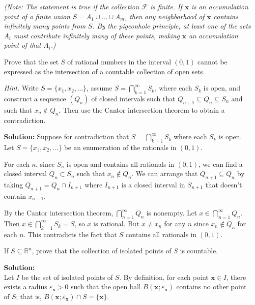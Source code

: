 \textit{(Note: The statement is true if the collection $\mathcal{F}$ is finite. If $\mathbf{x}$ is an accumulation point of a finite union $S = A_1 \cup \dots \cup A_m$, then any neighborhood of $\mathbf{x}$ contains infinitely many points from $S$. By the pigeonhole principle, at least one of the sets $A_i$ must contribute infinitely many of these points, making $\mathbf{x}$ an accumulation point of that $A_i$.)}


\begin{problembox}
Prove that the set \( S \) of rational numbers in the interval \( (0, 1) \) cannot be expressed as the intersection of a countable collection of open sets. 

\textit{Hint.} Write \( S = \{x_1, x_2, \ldots\} \), assume \( S = \bigcap_{k=1}^{\infty} S_k \), where each \( S_k \) is open, and construct a sequence \( (Q_n) \) of closed intervals such that \( Q_{n+1} \subseteq Q_n \subseteq S_n \) and such that \( x_n \notin Q_n \). Then use the Cantor intersection theorem to obtain a contradiction.
\end{problembox}

\textbf{Solution:} Suppose for contradiction that $S = \bigcap_{k=1}^{\infty} S_k$ where each $S_k$ is open. Let $S = \{x_1, x_2, \ldots\}$ be an enumeration of the rationals in $(0,1)$.

For each $n$, since $S_n$ is open and contains all rationals in $(0,1)$, we can find a closed interval $Q_n \subset S_n$ such that $x_n \notin Q_n$. We can arrange that $Q_{n+1} \subseteq Q_n$ by taking $Q_{n+1} = Q_n \cap I_{n+1}$ where $I_{n+1}$ is a closed interval in $S_{n+1}$ that doesn't contain $x_{n+1}$.

By the Cantor intersection theorem, $\bigcap_{n=1}^{\infty} Q_n$ is nonempty. Let $x \in \bigcap_{n=1}^{\infty} Q_n$. Then $x \in \bigcap_{k=1}^{\infty} S_k = S$, so $x$ is rational. But $x \neq x_n$ for any $n$ since $x_n \notin Q_n$ for each $n$. This contradicts the fact that $S$ contains all rationals in $(0,1)$.

\begin{problembox}
If \( S \subseteq \mathbb{R}^n \), prove that the collection of isolated points of \( S \) is countable.
\end{problembox}

\textbf{Solution:}\\
Let $I$ be the set of isolated points of $S$. By definition, for each point $\mathbf{x} \in I$, there exists a radius $\varepsilon_{\mathbf{x}} > 0$ such that the open ball $B(\mathbf{x}; \varepsilon_{\mathbf{x}})$ contains no other point of $S$; that is, $B(\mathbf{x}; \varepsilon_{\mathbf{x}}) \cap S = \{\mathbf{x}\}$.

